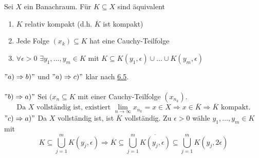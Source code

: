 \begin{kor}
	Sei $X$ ein Banachraum. Für $K \subseteq X$ sind äquivalent
	\begin{enumerate}[label=\alph*\upshape)]
		\item $K$ relativ kompakt (d.h. $\overline{K}$ ist kompakt)
		\item Jede Folge $(x_{k}) \subseteq K$ hat eine Cauchy-Teilfolge
		\item $\forall \epsilon > 0$ $\exists y_{1}, \dotsc, y_{m} \in K$ mit $K \subseteq K(y_{1}, \epsilon) \cup \dotsc \cup K(y_{m}, \epsilon)$
	\end{enumerate}
\end{kor}

\begin{beweis}
	$"a) \Rightarrow b)"$ und $"a) \Rightarrow c)"$ klar nach \hyperref[satz:6.5]{6.5}. \\ \\
	$"b) \Rightarrow a)"$ Sei $(x_{n} \subseteq K$ mit einer Cauchy-Teilfolge $(x_{n_{k}})$. \\
		\[ \text{Da } X \text{ vollständig ist, existiert } \lim_{n \rightarrow \infty} x_{n_{k}} = x \in X \Rightarrow x \in \overline{K} \Rightarrow \overline{K} \text{ kompakt.} \]
	$"c) \Rightarrow a)"$ Da $X$ vollständig ist, ist $\overline{K}$ vollständig. Zu $\epsilon > 0$ wähle $y_{1}, \dotsc, y_{m} \in K$ mit 
		\[ K \subseteq \bigcup_{j = 1}^{m} K(y_{j}, \epsilon) \Rightarrow \overline{K} \subseteq \bigcup_{j = 1}^{m} \overline{K(y_{j}, \epsilon)} \subseteq \bigcup_{j = 1}^{m} K(y_{j}, 2\epsilon) \]
\end{beweis}



\newpage
